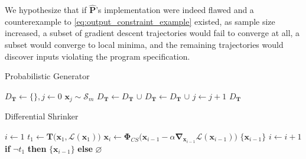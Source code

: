 We hypothesize that if $\mathbf{\hat P}$'s implementation were indeed flawed and a counterexample to \autoref{eq:output_constraint_example} existed, as sample size increased, a subset of gradient descent trajectories would fail to converge at all, a subset would converge to local minima, and the remaining trajectories would discover inputs violating the program specification.

\begin{algorithm}[ht]
\caption{Probabilistic Generator}
\label{alg:prob_adversary}
\begin{algorithmic}[1]
\State $D_\mathbf T \gets \{\}, j \gets 0$
\State $\mathbf{x}_j \sim \mathcal S_m$
 
\State $D_\mathbf T \gets D_\mathbf T$ $\cup$ 
\Else {}
\State $D_\mathbf T \gets D_\mathbf T$ $\cup$  
\EndIf
\State $j \gets j + 1$
\EndWhile
\State \Return $D_\mathbf T$
\EndProcedure
\end{algorithmic}
\end{algorithm}

\begin{algorithm}[ht]
\caption{Differential Shrinker}
\label{alg:diff_adversary}
\begin{algorithmic}[1]
\State $i \gets 1$
\State $t_1 \gets \mathbf T\big(\mathbf x_1, \mathcal L(\mathbf x_1)\big)$ 
 
\State $\mathbf x_i \gets \bm\Phi_{CS}\big(\mathbf x_{i-1} - \alpha\mathbf\nabla_{\mathbf x_{i-1}} \mathcal{L}(\mathbf{x}_{i-1})\big)$ 
 
\State \Return $\{\mathbf{x}_{i-1}\}$ 
\EndIf
\State $i \gets i + 1$
\EndWhile
\State \Return \textbf{if } $\neg t_1$ \textbf{ then } $\{\mathbf x_{i-1}\}$ \textbf{ else } $\varnothing$ 
\EndProcedure
\end{algorithmic}
\end{algorithm}

